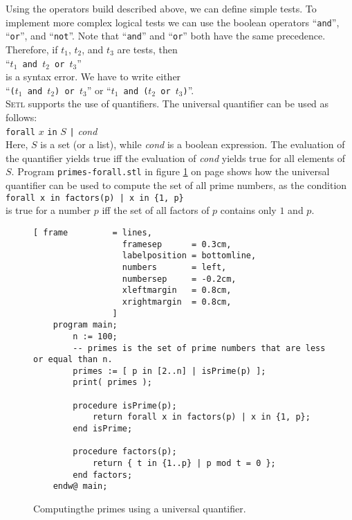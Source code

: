 Using the operators build described above, we can define simple tests.  To implement
more complex logical tests we can use the boolean operators  ``\texttt{and}'',
``\texttt{or}'', and ``\texttt{not}''.  Note that ``\texttt{and}'' and ``\texttt{or}''
both have the same precedence.  Therefore, if $t_1$, $t_2$, and $t_3$ are tests, then
\\[0.2cm]
\hspace*{1.3cm}
``\texttt{$t_1$ and $t_2$ or $t_3$}''
\\[0.2cm]
is a syntax error. We have to write either  
\\[0.2cm]
\hspace*{1.3cm}
``\texttt{($t_1$ and $t_2$) or $t_3$}'' \quad or \quad
``\texttt{$t_1$ and ($t_2$ or $t_3$)}''.
\\[0.2cm]
\textsc{Setl} supports the use of quantifiers.  The universal quantifier can be used as follows:
\\[0.2cm]
\hspace*{1.3cm}
\texttt{forall} $x$ \texttt{in} $S$ \texttt{|} \textsl{cond}
\\[0.2cm]
Here, $S$ is a set (or a list), while \textsl{cond} is a boolean expression.
The evaluation of the quantifier yields true iff the evaluation of  \textsl{cond} yields
true for all elements of  $S$.
Program \texttt{primes-forall.stl} in figure \ref{fig:primes-forall.stl} on page
\pageref{fig:primes-forall.stl} shows how the universal quantifier can be used to compute
the set of all prime numbers, as the condition
\\[0.2cm]
\hspace*{1.3cm}
\texttt{forall x in factors(p) | x in \{1, p\}}
\\[0.2cm]
is true for a number $p$ iff the set of all factors of $p$ contains only $1$ and $p$.

\begin{figure}[!ht]
\centering
\begin{Verbatim}[ frame         = lines, 
                  framesep      = 0.3cm, 
                  labelposition = bottomline,
                  numbers       = left,
                  numbersep     = -0.2cm,
                  xleftmargin   = 0.8cm,
                  xrightmargin  = 0.8cm,
                ]
    program main;
        n := 100;
        -- primes is the set of prime numbers that are less or equal than n.
        primes := [ p in [2..n] | isPrime(p) ];
        print( primes );

        procedure isPrime(p);
            return forall x in factors(p) | x in {1, p};
        end isPrime;

        procedure factors(p);
            return { t in {1..p} | p mod t = 0 };
        end factors;
    endw@ main;
\end{Verbatim}
\vspace*{-0.3cm}
\caption{Computingthe primes using a universal quantifier.}
\label{fig:primes-forall.stl}
\end{figure}

